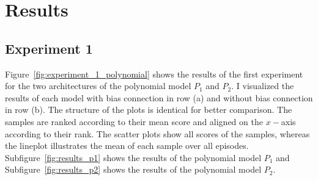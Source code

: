 \section{Results}
\subsection{Experiment 1}
Figure~\ref{fig:experiment_1_polynomial} shows the results of the first experiment for the two architectures of the polynomial model $P_1$ and $P_2$. I visualized the results of each model with bias connection in row (a) and without bias connection in row (b). The structure of the plots is identical for better comparison. The samples are ranked according to their mean score and aligned on the $x-$axis according to their rank. The scatter plots show all scores of the samples, whereas the lineplot illustrates the mean of each sample over all episodes.
Subfigure~\ref{fig:results_p1} shows the results of the polynomial model $P_1$ and Subfigure~\ref{fig:results_p2} shows the results of the polynomial model $P_2$.
